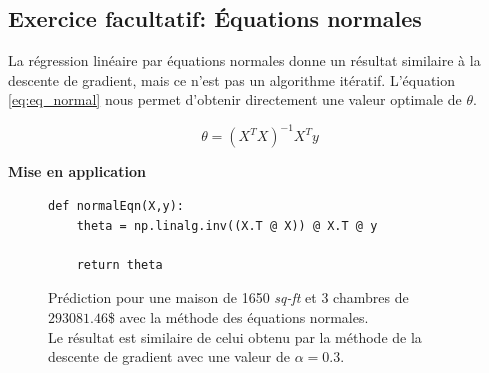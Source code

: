 \subsection{Exercice facultatif: Équations normales}

La régression linéaire par équations normales donne un résultat similaire à la descente de gradient, mais ce n'est pas un algorithme itératif. L'équation \ref{eq:eq_normal} nous permet d'obtenir directement une 
valeur optimale de $\theta$.

\begin{equation}\label{eq:eq_normal}
    \theta = (X^T X)^{-1} X^T y
\end{equation}  


\vspace{.5cm}
\noindent
\textbf{Mise en application}
\vspace{.2cm}


\begin{figure}[!h]
    \begin{minipage}{.48\linewidth}
\begin{verbatim}
def normalEqn(X,y):
    theta = np.linalg.inv((X.T @ X)) @ X.T @ y

    return theta
\end{verbatim}   
\label{listing:normalEqn}
    \end{minipage}\hfill
    \begin{minipage}{.48\linewidth}
        Prédiction pour une maison de 1650 \textit{sq-ft} et 3 chambres de $293081.46$\$ avec la méthode des équations normales. \\
        Le résultat est similaire de celui obtenu par la méthode de la descente de gradient avec une valeur de $\alpha = 0.3$.
    \end{minipage}
\end{figure}

